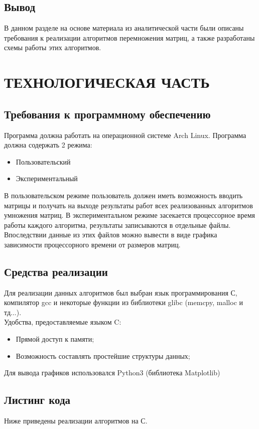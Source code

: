 \documentclass[a4paper,12pt]{article}
\begin{document}

\newpage
\subsection{Вывод}
В данном разделе на основе материала из аналитической части были описаны требования к реализации алгоритмов перемножения матриц, а также разработаны схемы работы этих алгоритмов.

\newpage
\section{ТЕХНОЛОГИЧЕСКАЯ ЧАСТЬ}
\subsection{Требования к программному обеспечению}

Программа должна работать на операционной системе Arch Linux. Программа должна
содержать 2 режима:
\begin{itemize}
\item Пользовательский
\item Экспериментальный
\end{itemize}
В пользовательском режиме пользователь должен иметь возможность вводить матрицы и получать на выходе результаты работ всех реализованных алгоритмов умножения матриц. В экспериментальном режиме засекается процессорное время работы каждого алгоритма, результаты записываются в отдельные файлы. Впоследствии данные из этих файлов можно вывести в виде графика зависимости процессорного времени от размеров матриц.

\newpage
\subsection{Средства реализации}
Для реализации данных алгоритмов был выбран язык программирования С, компилятор
gcc и некоторые функции из библиотеки glibc (memcpy, malloc и тд...). \\
Удобства, предоставляемые языком C:
\begin{itemize}
\item Прямой доступ к памяти;
\item Возможность составлять простейшие структуры данных;
\end{itemize}
Для вывода графиков использовался Python3 (библиотека Matplotlib)

\newpage
\subsection{Листинг кода}
Ниже приведены реализации алгоритмов на С.\\
\end{document}
